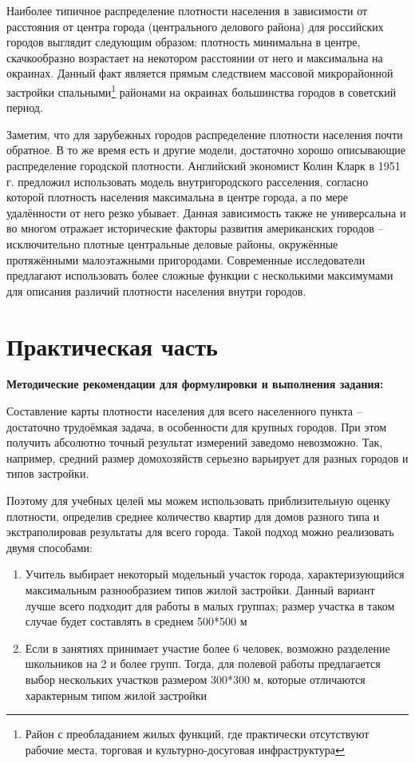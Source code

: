 \documentclass[
  11pt,
]{book}
\begin{document}
Наиболее типичное распределение плотности населения в зависимости от расстояния от центра города (центрального делового района) для российских городов выглядит следующим образом: плотность минимальна в центре, скачкообразно возрастает на некотором расстоянии от него и максимальна на окраинах. Данный факт является прямым следствием массовой микрорайонной застройки спальными\footnote{Район с преобладанием жилых функций, где практически отсутствуют рабочие места, торговая и культурно-досуговая инфраструктура} районами на окраинах большинства городов в советский период.

Заметим, что для зарубежных городов распределение плотности населения почти обратное. В то же время есть и другие модели, достаточно хорошо описывающие распределение городской плотности. Английский экономист Колин Кларк в 1951 г. предложил использовать модель внутригородского расселения, согласно которой плотность населения максимальна в центре города, а по мере удалённости от него резко убывает. Данная зависимость также не универсальна и во многом отражает исторические факторы развития американских городов -- исключительно плотные центральные деловые районы, окружённые протяжёнными малоэтажными пригородами. Современные исследователи предлагают использовать более сложные функции с несколькими максимумами для описания различий плотности населения внутри городов.

\section*{Практическая часть}\label{ux43fux440ux430ux43aux442ux438ux447ux435ux441ux43aux430ux44f-ux447ux430ux441ux442ux44c-1}

\textbf{Методические рекомендации для формулировки и выполнения задания:}

Составление карты плотности населения для всего населенного пункта -- достаточно трудоёмкая задача, в особенности для крупных городов. При этом получить абсолютно точный результат измерений заведомо невозможно. Так, например, средний размер домохозяйств серьезно варьирует для разных городов и типов застройки.

Поэтому для учебных целей мы можем использовать приблизительную оценку плотности, определив среднее количество квартир для домов разного типа и экстраполировав результаты для всего города. Такой подход можно реализовать двумя способами:

\begin{enumerate}
\def\labelenumi{\arabic{enumi})}
\item
  Учитель выбирает некоторый модельный участок города, характеризующийся максимальным разнообразием типов жилой застройки. Данный вариант лучше всего подходит для работы в малых группах; размер участка в таком случае будет составлять в среднем 500*500 м
\item
  Если в занятиях принимает участие более 6 человек, возможно разделение школьников на 2 и более групп. Тогда, для полевой работы предлагается выбор нескольких участков размером 300*300 м, которые отличаются характерным типом жилой застройки
\end{enumerate}
\end{document}

